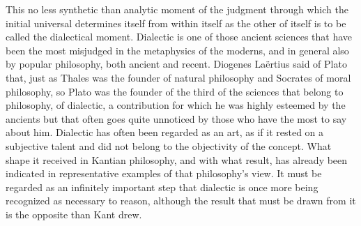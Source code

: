 This no less synthetic than analytic moment of the judgment
through which the initial universal determines itself
from within itself as the other of itself
is to be called the dialectical moment.
Dialectic is one of those ancient sciences
that have been the most misjudged in
the metaphysics of the moderns,
and in general also by popular philosophy,
both ancient and recent.
Diogenes Laërtius said of Plato that,
just as Thales was the founder of natural philosophy
and Socrates of moral philosophy,
so Plato was the founder of the third of
the sciences that belong to philosophy,
of dialectic, a contribution for which
he was highly esteemed by the ancients
but that often goes quite unnoticed
by those who have the most to say about him.
Dialectic has often been regarded as an art,
as if it rested on a subjective talent
and did not belong to the objectivity of the concept.
What shape it received in Kantian philosophy,
and with what result, has already been
indicated in representative examples of that philosophy's view.
It must be regarded as an infinitely important step
that dialectic is once more being
recognized as necessary to reason,
although the result that must be drawn from it
is the opposite than Kant drew.

